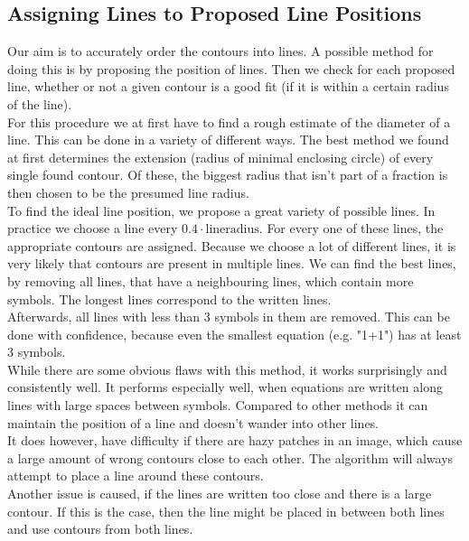 \documentclass[12pt]{article}
\begin{document}
\begin{itemize}
\begin{itemize}
\begin{itemize}
\begin{itemize}
\begin{itemize}
\begin{itemize}
\begin{itemize}
\begin{itemize}
\begin{itemize}
\begin{itemize}
	\subsection{Assigning Lines to Proposed Line Positions}
	Our aim is to accurately order the contours into lines.
	A possible method for doing this is by proposing the position of lines.
	Then we check for each proposed line, whether or not a given contour is a good fit (if it is within a certain radius of the line).\\
	For this procedure we at first have to find a rough estimate of the diameter of a line.
	This can be done in a variety of different ways.
	The best method we found at first determines the extension (radius of minimal enclosing circle) of every single found contour.
	Of these, the biggest radius that isn't part of a fraction is then chosen to be the presumed line radius.\\
	To find the ideal line position, we propose a great variety of possible lines.
	In practice we choose a line every $0.4 \cdot \mathrm{line radius}$.
	For every one of these lines, the appropriate contours are assigned.
	Because we choose a lot of different lines, it is very likely that contours are present in multiple lines.
	We can find the best lines, by removing all lines, that have a neighbouring lines, which contain more symbols.
	The longest lines correspond to the written lines.\\
	Afterwards, all lines with less than 3 symbols in them are removed.
	This can be done with confidence, because even the smallest equation (e.g. "1+1") has at least 3 symbols.\\
	
	While there are some obvious flaws with this method, it works surprisingly and consistently well.
	It performs especially well, when equations are written along lines with large spaces between symbols.
	Compared to other methods it can maintain the position of a line and doesn't wander into other lines.\\
	It does however, have difficulty if there are hazy patches in an image, which cause a large amount of wrong contours close to each other.
	The algorithm will always attempt to place a line around these contours.\\
	Another issue is caused, if the lines are written too close and there is a large contour.
	If this is the case, then the line might be placed in between both lines and use contours from both lines.
	

\end{itemize}
\end{itemize}
\end{itemize}
\end{itemize}
\end{itemize}
\end{itemize}
\end{itemize}
\end{itemize}
\end{itemize}
\end{itemize}
\end{document}
